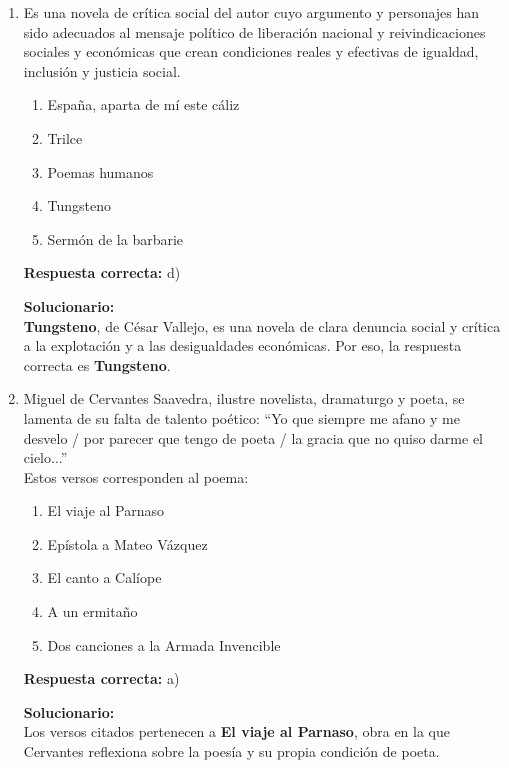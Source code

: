 \begin{enumerate}
	\item Es una novela de crítica social del autor cuyo argumento y personajes han sido adecuados al mensaje político de liberación nacional y reivindicaciones sociales y económicas que crean condiciones reales y efectivas de igualdad, inclusión y justicia social.
	\begin{enumerate}[label=\alph*)]
		\item España, aparta de mí este cáliz
		\item Trilce
		\item Poemas humanos
		\item Tungsteno
		\item Sermón de la barbarie
	\end{enumerate}
	\textbf{Respuesta correcta:} d)
	
	\vspace{2mm}
	\textbf{Solucionario:}\\
	\textbf{Tungsteno}, de César Vallejo, es una novela de clara denuncia social y crítica a la explotación y a las desigualdades económicas. Por eso, la respuesta correcta es \textbf{Tungsteno}.
	
	\vspace{6mm}
	
	\item Miguel de Cervantes Saavedra, ilustre novelista, dramaturgo y poeta, se lamenta de su falta de talento poético: ``Yo que siempre me afano y me desvelo / por parecer que tengo de poeta / la gracia que no quiso darme el cielo...''\\
	Estos versos corresponden al poema:
	\begin{enumerate}[label=\alph*)]
		\item El viaje al Parnaso
		\item Epístola a Mateo Vázquez
		\item El canto a Calíope
		\item A un ermitaño
		\item Dos canciones a la Armada Invencible
	\end{enumerate}
	\textbf{Respuesta correcta:} a)
	
	\vspace{2mm}
	\textbf{Solucionario:}\\
	Los versos citados pertenecen a \textbf{El viaje al Parnaso}, obra en la que Cervantes reflexiona sobre la poesía y su propia condición de poeta.
	
	\vspace{6mm}
	
\end{enumerate}

